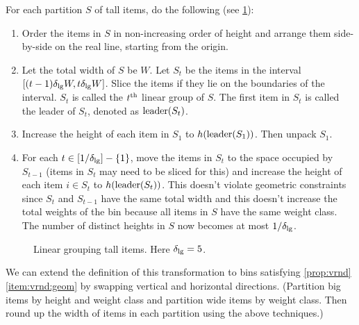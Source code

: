 \begin{transformation}
For each partition $S$ of tall items, do the following (see \cref{fig:tall-lingroup}):
\begin{enumerate}
\item Order the items in $S$ in non-increasing order of height and arrange them side-by-side
    on the real line, starting from the origin.
\item Let the total width of $S$ be $W$.
    Let $S_t$ be the items in the interval $[(t-1)\delta_{\mathrm{lg}} W, t \delta_{\mathrm{lg}} W]$.
    Slice the items if they lie on the boundaries of the interval.
    $S_t$ is called the $t^{\textrm{th}}$ linear group of $S$.
    The first item in $S_t$ is called the leader of $S_t$, denoted as $\operatorname{leader}(S_t)$.
\item Increase the height of each item in $S_1$ to $h(\operatorname{leader}(S_1))$. Then unpack $S_1$.
\item For each $t \in [1/\delta_{\mathrm{lg}}] - \{1\}$,
    move the items in $S_t$ to the space occupied by $S_{t-1}$
    (items in $S_t$ may need to be sliced for this)
    and increase the height of each item $i \in S_t$ to $h(\operatorname{leader}(S_t))$.
    This doesn't violate geometric constraints since $S_t$ and $S_{t-1}$
    have the same total width and this doesn't increase the total weights of the bin
    because all items in $S$ have the same weight class.
    The number of distinct heights in $S$ now becomes at most $1/\delta_{\mathrm{lg}}$.
\end{enumerate}

\begin{figure}[htb]
\centering

\caption{Linear grouping tall items. Here $\delta_{\mathrm{lg}} = 5$.}
\label{fig:tall-lingroup}
\end{figure}

We can extend the definition of this transformation to bins satisfying
\cref{prop:vrnd}\ref{item:vrnd:geom} by swapping vertical and horizontal directions.
(Partition big items by height and weight class and partition wide items by weight class.
Then round up the width of items in each partition using the above techniques.)
\end{transformation}

